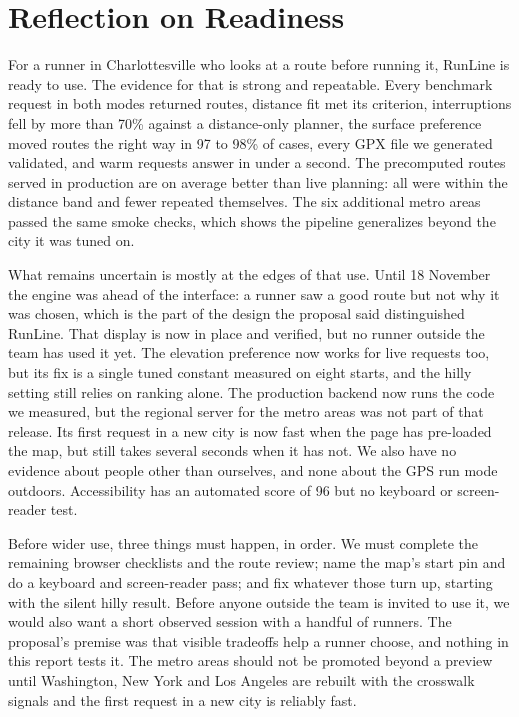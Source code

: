 \section{Reflection on Readiness}
\label{sec:readiness}

For a runner in Charlottesville who looks at a route before running it,
RunLine is ready to use. The evidence for that is strong and repeatable. Every
benchmark request in both modes returned routes, distance fit met its
criterion, interruptions fell by more than 70\% against a distance-only
planner, the surface preference moved routes the right way in 97 to 98\% of
cases, every GPX file we generated validated, and warm requests answer in
under a second. The precomputed routes served in production are on average
better than live planning: all were within the distance band and fewer
repeated themselves. The six additional metro areas passed the same smoke
checks, which shows the pipeline generalizes beyond the city it was tuned on.

What remains uncertain is mostly at the edges of that use. Until 18 November the engine was ahead of the interface: a runner saw a good
route but not why it was chosen, which is the part of the design the proposal
said distinguished RunLine. That display is now in place and verified, but no
runner outside the team has used it yet. The elevation preference now works
for live requests too, but its fix is a single tuned constant measured on
eight starts, and the hilly setting still relies on ranking alone. The
production backend now runs the code we measured, but the regional server for
the metro areas was not part of that release. Its first request in a new city
is now fast when the page has pre-loaded the map, but still takes several
seconds when it has not. We also have no evidence about
people other than ourselves, and none about the GPS run mode outdoors.
Accessibility has an automated score of 96 but no keyboard or screen-reader
test.

Before wider use, three things must happen, in order. We must complete the remaining browser checklists and the route review;
name the map's start pin and do a keyboard and screen-reader pass; and fix
whatever those turn up, starting with the silent hilly result. Before anyone outside the team is invited to use it, we
would also want a short observed session with a handful of runners. The
proposal's premise was that visible tradeoffs help a runner choose, and
nothing in this report tests it. The metro
areas should not be promoted beyond a preview until Washington, New York and
Los Angeles are rebuilt with the crosswalk signals and the first request in a
new city is reliably fast.

